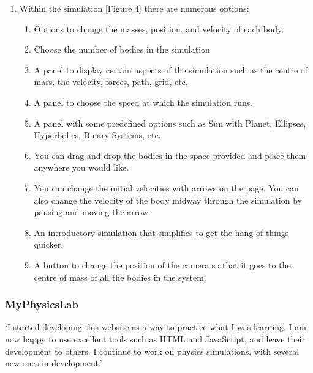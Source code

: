 \documentclass[12pt]{article}
\begin{document}
\begin{enumerate}
    \item Within the simulation [Figure 4] there are numerous options:
        \begin{enumerate}
            \item Options to change the masses, position, and velocity of each body.
            \item Choose the number of bodies in the simulation
            \item A panel to display certain aspects of the simulation such as the centre of mass, the velocity, forces, path, grid, etc. 
            \item A panel to choose the speed at which the simulation runs.
            \item A panel with some predefined options such as Sun with Planet, Ellipses, Hyperbolics, Binary Systems, etc.
            \item You can drag and drop the bodies in the space provided and place them anywhere you would like.
            \item You can change the initial velocities with arrows on the page. You can also change the velocity of the body midway through the simulation by pausing and moving the arrow.
            \item An introductory simulation that simplifies to get the hang of things quicker.
            \item A button to change the position of the camera so that it goes to the centre of mass of all the bodies in the system.
        \end{enumerate}


\end{enumerate}




\newpage
\subsubsection{MyPhysicsLab}
`I started developing this website as a way to practice what I was learning. I am now happy to use excellent tools such as HTML and JavaScript, and leave their development to others. I continue to work on physics simulations, with several new ones in development.' \cite{aboutphyslab} \\
\end{document}
